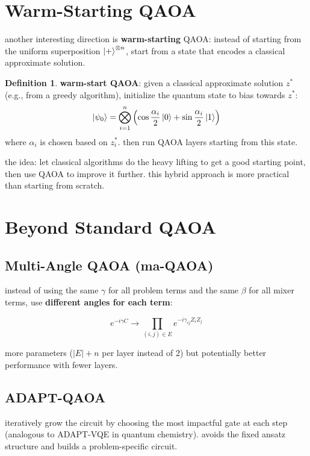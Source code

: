 \documentclass[11pt,a4paper]{article}
\theoremstyle{definition}
\newtheorem{definition}{Definition}[section]
\theoremstyle{remark}
\begin{document}
\section{Warm-Starting QAOA}

another interesting direction is \textbf{warm-starting} QAOA: instead of starting from the uniform superposition $\ket{+}^{\otimes n}$, start from a state that encodes a classical approximate solution.

\begin{definition}
\textbf{warm-start QAOA}: given a classical approximate solution $z^*$ (e.g., from a greedy algorithm), initialize the quantum state to bias towards $z^*$:
\[
\ket{\psi_0} = \bigotimes_{i=1}^n \left(\cos\frac{\alpha_i}{2}\ket{0} + \sin\frac{\alpha_i}{2}\ket{1}\right)
\]
where $\alpha_i$ is chosen based on $z^*_i$. then run QAOA layers starting from this state.
\end{definition}

the idea: let classical algorithms do the heavy lifting to get a good starting point, then use QAOA to improve it further. this hybrid approach is more practical than starting from scratch.

\section{Beyond Standard QAOA}

\subsection{Multi-Angle QAOA (ma-QAOA)}

instead of using the same $\gamma$ for all problem terms and the same $\beta$ for all mixer terms, use \textbf{different angles for each term}:

\[
e^{-i\gamma C} \to \prod_{(i,j) \in E} e^{-i\gamma_{ij} Z_i Z_j}
\]

more parameters ($|E| + n$ per layer instead of 2) but potentially better performance with fewer layers.

\subsection{ADAPT-QAOA}

iteratively grow the circuit by choosing the most impactful gate at each step (analogous to ADAPT-VQE in quantum chemistry). avoids the fixed ansatz structure and builds a problem-specific circuit.
\end{document}
